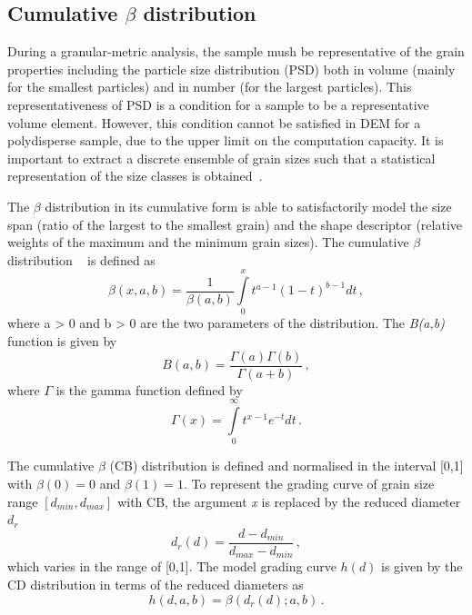 \subsection[Cumulative beta distribution]{Cumulative $\beta$ distribution}

During a granular-metric analysis, the sample mush be representative of the 
grain properties including the particle size distribution (PSD) both in volume 
(mainly for the smallest particles) and in number (for the largest particles). 
This representativeness of PSD is a condition for a sample to be a 
representative volume element. However, this condition cannot be satisfied in 
DEM for a polydisperse sample, due to the upper limit on the computation 
capacity. It is important to extract a discrete ensemble of grain sizes such 
that a statistical representation of the size classes is 
obtained~\citep{Radjai2011}.

The $\beta$ distribution in its cumulative form is able to satisfactorily model 
the size span (ratio of the largest to the smallest grain) and the shape 
descriptor (relative weights of the maximum and the minimum grain sizes). The 
cumulative $\beta$ distribution ~\citep{Voivret2007} is defined as
%
\begin{equation}
\beta(x,a,b) = \frac{1}{\beta (a,b)}\int\limits_{0}^{x}t^{a-1}(1-t)^{b-1}dt \,,
\end{equation}
%
where a > 0 and b > 0 are the two parameters of the distribution. The 
\textit{B(a,b)} function is given by
%
\begin{equation}
B(a,b) = \frac{\Gamma(a)\Gamma(b)}{\Gamma(a+b)} \,,
\end{equation}
%
where $\Gamma$ is the gamma function defined by
%
\begin{equation}
\Gamma(x) = \int\limits_{0}^{\infty}t^{x-1}e^{-t}dt \,.
\end{equation}

The cumulative $\beta$ (CB) distribution is defined and normalised in the 
interval [0,1] with $\beta(0) = 0$ and  $\beta(1) = 1$. To represent the 
grading curve of grain size range $[d_{min},d_{max}]$ with CB, the argument 
\textit{x} is replaced by the reduced diameter $d_r$
%
\begin{equation}
d_r(d) = \frac{d - d_{min}}{d_{max} - d_{min}} \,,
\end{equation}
%
which varies in the range of [0,1]. The model grading curve $h(d)$ is given by 
the CD distribution in terms of the reduced diameters as
%
\begin{equation}
h(d,a,b) = \beta(d_r(d);a,b) \,.
\end{equation}

